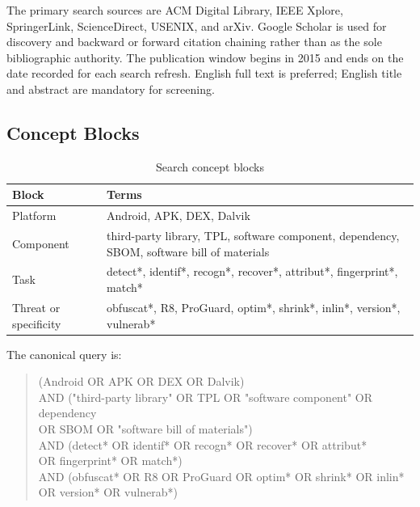 The primary search sources are ACM Digital Library, IEEE Xplore, SpringerLink,
ScienceDirect, USENIX, and arXiv. Google Scholar is used for discovery and
backward or forward citation chaining rather than as the sole bibliographic
authority. The publication window begins in 2015 and ends on the date recorded
for each search refresh. English full text is preferred; English title and
abstract are mandatory for screening.

\subsection{Concept Blocks}

\begin{table}[H]
  \centering
  \caption{Search concept blocks}
  \label{tab:review-search-blocks}
  \begin{tabularx}{\textwidth}{p{}X}
    \toprule
    Block & Terms \\
    \midrule
    Platform & Android, APK, DEX, Dalvik \\
    Component & third-party library, TPL, software component, dependency,
      SBOM, software bill of materials \\
    Task & detect*, identif*, recogn*, recover*, attribut*, fingerprint*,
      match* \\
    Threat or specificity & obfuscat*, R8, ProGuard, optim*, shrink*, inlin*,
      version*, vulnerab* \\
    \bottomrule
  \end{tabularx}
\end{table}

The canonical query is:

\begin{quote}\footnotesize\ttfamily
(Android OR APK OR DEX OR Dalvik)\\
AND ("third-party library" OR TPL OR "software component" OR dependency\\
\hspace*{1.5em}OR SBOM OR "software bill of materials")\\
AND (detect* OR identif* OR recogn* OR recover* OR attribut*\\
\hspace*{1.5em}OR fingerprint* OR match*)\\
AND (obfuscat* OR R8 OR ProGuard OR optim* OR shrink* OR inlin*\\
\hspace*{1.5em}OR version* OR vulnerab*)
\end{quote}

